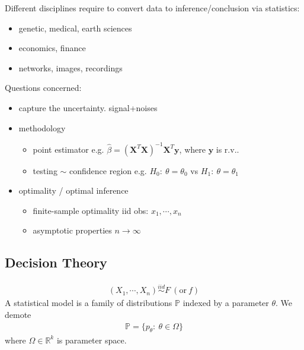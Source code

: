 
Different disciplines require to convert data to 
inference/conclusion via statistics:
\begin{itemize}
    \item genetic, medical, earth sciences
    \item economics, finance
    \item networks, images, recordings
\end{itemize}
$~$\\
Questions concerned:
\begin{itemize}
    \item capture the uncertainty. {\color{gray}signal+noises}
    \item methodology
    \begin{itemize}
        \item point estimator 
        {\color{gray}e.g. 
        $\hat{\beta}=
        (\boldsymbol{X}^T\boldsymbol{X})^{-1}\boldsymbol{X}^T\boldsymbol{y}$, where $\boldsymbol{y}$ is r.v..
        }
        \item testing $\sim$ confidence region
        {\color{gray} e.g.
        $H_0:~\theta=\theta_0$ vs $H_1:~\theta=\theta_1$
        }
    \end{itemize}
    \item optimality / optimal inference
    \begin{itemize}
        \item finite-sample optimality 
        {\color{gray}
        iid obs: $x_1,\cdots,x_n$
        }
        \item asymptotic properties 
        {\color{gray} 
        $n\to\infty$
        }
    \end{itemize}
\end{itemize}

\subsection{Decision Theory }%

\begin{gather}
    (X_1,\cdots,X_n)\overset{iid}{\sim}F~(\text{or}~f)
\end{gather}
A statistical model is a family of distributions $\mathbb{P}$ indexed by
a parameter $\theta$. We demote
\begin{gather}
    \mathbb{P}=\{p_\theta:~\theta\in\Omega\}
\end{gather}
where $\Omega\in\mathbb{R}^k$ is parameter space.

